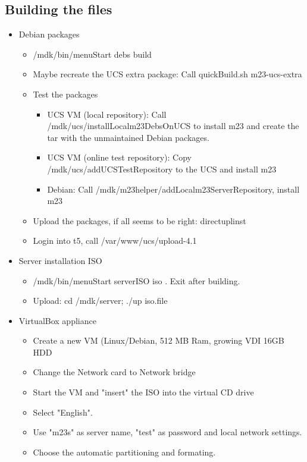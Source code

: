 \subsection{Building the files}
\begin{itemize}
\item Debian packages
	\begin{itemize}
		\item /mdk/bin/menuStart \Rightarrow debs \Rightarrow build
		\item Maybe recreate the UCS extra package: Call quickBuild.sh m23-ucs-extra
		\item Test the packages
		\begin{itemize}
			\item UCS VM (local repository): Call /mdk/ucs/installLocalm23DebsOnUCS to install m23 and create the tar with the unmaintained Debian packages.
			\item UCS VM (online test repository): Copy /mdk/ucs/addUCSTestRepository to the UCS and install m23
			\item Debian: Call /mdk/m23helper/addLocalm23ServerRepository, install m23
		\end{itemize}
		\item Upload the packages, if all seems to be right: \Rightarrow directuplinst
		\item Login into t5, call /var/www/ucs/upload-4.1
	\end{itemize}
\item Server installation ISO
	\begin{itemize}
		\item /mdk/bin/menuStart \Rightarrow serverISO \Rightarrow iso . Exit after building.
		\item Upload: cd /mdk/server; ./up iso.file
	\end{itemize}
\item VirtualBox appliance
	\begin{itemize}
		\item Create a new VM (Linux/Debian, 512 MB Ram, growing VDI 16GB HDD
		\item Change the Network card to Network bridge
		\item Start the VM and "insert" the ISO into the virtual CD drive
		\item Select "English".
		\item Use "m23s" as server name, "test" as password and local network settings.
		\item Choose the automatic partitioning and formating.

\end{itemize}
\end{itemize}
